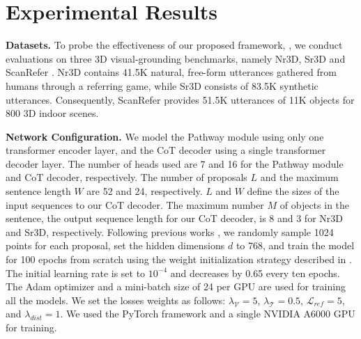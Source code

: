 \section{Experimental Results}
\label{sec_experiment}


\noindent \textbf{Datasets.}
To probe the effectiveness of our proposed framework, {\papernameAbbrev}, we conduct evaluations on three 3D visual-grounding benchmarks, namely Nr3D, Sr3D \citep{achlioptas2020referit3d} and ScanRefer \citep{chen2020scanrefer}.
Nr3D contains 41.5K natural, free-form utterances gathered from humans through a referring game, while Sr3D consists of 83.5K synthetic utterances. 
Consequently, ScanRefer provides 51.5K utterances of 11K objects for 800 3D indoor scenes.

\noindent \textbf{Network Configuration.}
We model the Pathway module using only one transformer encoder layer, and the CoT decoder using a single transformer decoder layer.
The number of heads used are 7 and 16 for the Pathway module and CoT decoder, respectively.
The number of proposals $L$ and the maximum sentence length $W$ are 52 and 24, respectively. $L$ and $W$ define the sizes of the input sequences to our CoT decoder.
The maximum number $M$ of objects in the sentence, the output sequence length for our CoT decoder, is 8 and 3 for Nr3D and Sr3D, respectively.
Following previous works \citep{abdelreheem20223dreftransformer, achlioptas2020referit3d, he2021transrefer3d, roh2022languagerefer, jain2021looking, yang2021sat, qi2017pointnet++}, we randomly sample 1024 points for each proposal, set the hidden dimensions $d$ to 768, and train the model for 100 epochs from scratch using the weight initialization strategy described in \citep{he2015delving}.
The initial learning rate is set to $10^{-4}$ and decreases by 0.65 every ten epochs. 
The Adam optimizer \citep{kingma2014adam} and a mini-batch size of 24 per GPU are used for training all the models.
We set the losses weights as follows: $\lambda_{{\mathcal{V}}}=5$, $\lambda_{{\mathcal{T}}}=0.5$, $\mathcal{L}_{ref}=5$, and $\lambda_{dist}=1$.
We used the PyTorch framework and a single NVIDIA A6000 GPU for training.
